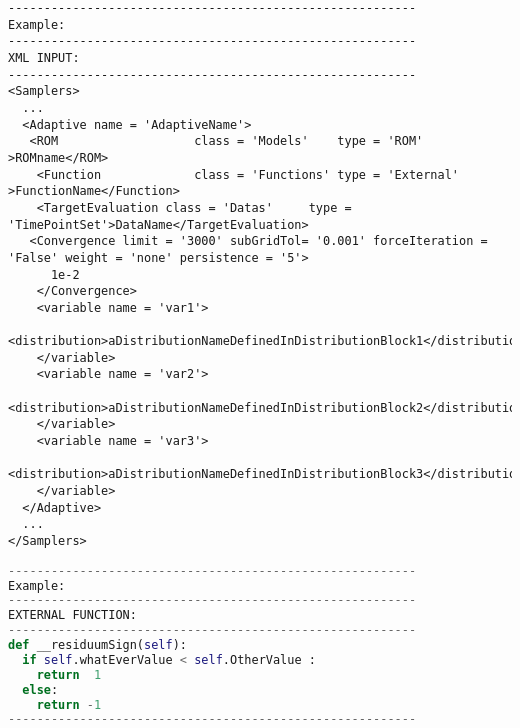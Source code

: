 \begin{lstlisting}[style=XML]
---------------------------------------------------------
Example:
---------------------------------------------------------
XML INPUT:
--------------------------------------------------------- 
<Samplers>
  ...
  <Adaptive name = 'AdaptiveName'>
   <ROM                   class = 'Models'    type = 'ROM'            >ROMname</ROM>
    <Function             class = 'Functions' type = 'External'      >FunctionName</Function>
    <TargetEvaluation class = 'Datas'     type = 'TimePointSet'>DataName</TargetEvaluation>
   <Convergence limit = '3000' subGridTol= '0.001' forceIteration = 'False' weight = 'none' persistence = '5'>
      1e-2
    </Convergence>
    <variable name = 'var1'>
        <distribution>aDistributionNameDefinedInDistributionBlock1</distribution> 
    </variable>
    <variable name = 'var2'>
        <distribution>aDistributionNameDefinedInDistributionBlock2</distribution> 
    </variable>
    <variable name = 'var3'>
        <distribution>aDistributionNameDefinedInDistributionBlock3</distribution> 
    </variable>
  </Adaptive>
  ...
</Samplers>
\end{lstlisting} 
\begin{lstlisting}[language=python]
---------------------------------------------------------
Example:
---------------------------------------------------------
EXTERNAL FUNCTION:
---------------------------------------------------------
def __residuumSign(self):
  if self.whatEverValue < self.OtherValue : 
    return  1
  else: 
    return -1
---------------------------------------------------------
\end{lstlisting} 

